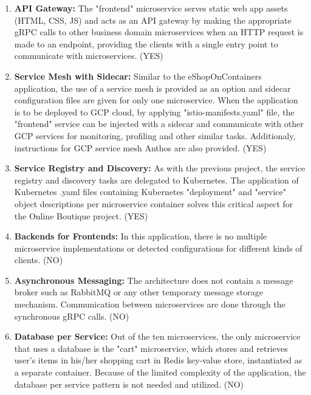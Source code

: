 \documentclass{Configuration_Files/PoliMi3i_thesis}
\begin{document}
\begin{enumerate}
    \item \textbf{API Gateway:} The "frontend" microservice serves static web app assets (HTML, CSS, JS) and acts as an API gateway by making the appropriate gRPC calls to other business domain microservices when an HTTP request is made to an endpoint, providing the clients with a single entry point to communicate with microservices. (YES)
    
    \item \textbf{Service Mesh with Sidecar:} Similar to the eShopOnContainers application, the use of a service mesh is provided as an option and sidecar configuration files are given for only one microservice.
    When the application is to be deployed to GCP cloud, by applying "istio-manifests.yaml" file, the "frontend" service can be injected with a sidecar and communicate with other GCP services for monitoring, profiling and other similar tasks. 
    Additionaly, instructions for GCP service mesh Anthos are also provided. (YES)
    
    \item \textbf{Service Registry and Discovery:} As with the previous project, the service registry and discovery tasks are delegated to Kubernetes.
    The application of Kubernetes .yaml files containing Kubernetes "deployment" and "service" object descriptions per microservice container solves this critical aspect for the Online Boutique project. (YES)
    
    \item \textbf{Backends for Frontends:} In this application, there is no multiple microservice implementations or detected configurations for different kinds of clients. (NO)
    
    \item \textbf{Asynchronous Messaging:} The architecture does not contain a message broker such as RabbitMQ or any other temporary message storage mechanism.
    Communication between microservices are done through the synchronous gRPC calls. (NO)
    
    \item \textbf{Database per Service:} Out of the ten microservices, the only microservice that uses a database is the "cart" microservice, which stores and retrieves user's items in his/her shopping cart in Redis key-value store, instantiated as a separate container.
    Because of the limited complexity of the application, the database per service pattern is not needed and utilized. (NO)
    

\end{enumerate}
\end{document}
